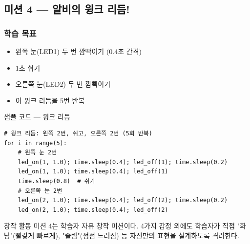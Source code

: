 \subsection{미션 4 --- 알비의 윙크 리듬!}
\label{subsec:ch03-m4}

\begin{storybox}
\end{storybox}

\subsubsection*{학습 목표}
\begin{itemize}[leftmargin=1.4em]
  \item 왼쪽 눈(LED1) 두 번 깜빡이기 (0.4초 간격)
  \item 1초 쉬기
  \item 오른쪽 눈(LED2) 두 번 깜빡이기
  \item 이 윙크 리듬을 5번 반복
\end{itemize}

\begin{labbox}{샘플 코드 --- 윙크 리듬}
\begin{verbatim}
# 윙크 리듬: 왼쪽 2번, 쉬고, 오른쪽 2번 (5회 반복)
for i in range(5):
    # 왼쪽 눈 2번
    led_on(1, 1.0); time.sleep(0.4); led_off(1); time.sleep(0.2)
    led_on(1, 1.0); time.sleep(0.4); led_off(1)
    time.sleep(0.8)  # 쉬기
    # 오른쪽 눈 2번
    led_on(2, 1.0); time.sleep(0.4); led_off(2); time.sleep(0.2)
    led_on(2, 1.0); time.sleep(0.4); led_off(2)
\end{verbatim}
\end{labbox}

\begin{notebox}{창작 활동}
미션 4는 학습자 자유 창작 미션이다. 4가지 감정 외에도 학습자가 직접
"화남"(빨갛게 빠르게), "졸림"(점점 느려짐) 등 자신만의 표현을
설계하도록 격려한다.
\end{notebox}
